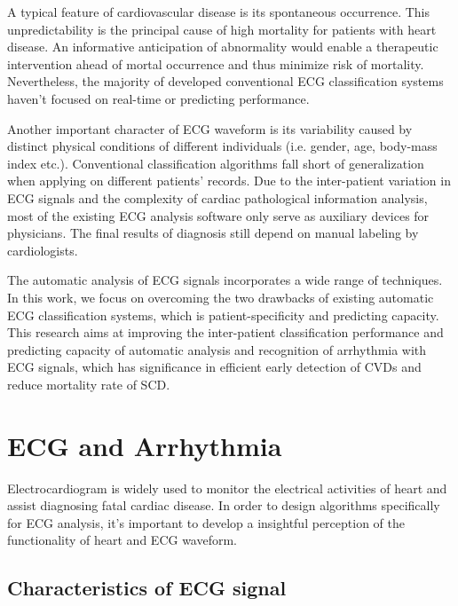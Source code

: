 A typical feature of cardiovascular disease is its spontaneous occurrence. This unpredictability is the principal cause of high mortality for patients with heart disease. An informative anticipation of abnormality would enable a therapeutic intervention ahead of mortal occurrence and thus minimize risk of mortality. Nevertheless, the majority of developed conventional ECG classification systems haven't focused on real-time or predicting performance. %

Another important character of ECG waveform is its variability caused by distinct physical conditions of different individuals (i.e. gender, age, body-mass index etc.)\cite{agesex}\cite{intervaria}. Conventional classification algorithms fall short of generalization when applying on different patients' records\cite{llamedo2012automatic}. Due to the inter-patient variation in ECG signals and the complexity of cardiac pathological information analysis, most of the existing ECG analysis software only serve as auxiliary devices for physicians. The final results of diagnosis still depend on manual labeling by cardiologists. %

The automatic analysis of ECG signals incorporates a wide range of techniques. In this work, we focus on overcoming the two drawbacks of existing automatic ECG classification systems, which is patient-specificity and predicting capacity. This research aims at improving the inter-patient classification performance and predicting capacity of automatic analysis and recognition of arrhythmia with ECG signals, which has significance in efficient early detection of CVDs and reduce mortality rate of SCD. 

\section{ECG and Arrhythmia}

Electrocardiogram is widely used to monitor the electrical activities of heart and assist diagnosing fatal cardiac disease. In order to design algorithms specifically for ECG analysis, it's important to develop a insightful perception of the functionality of heart and ECG waveform.  

\subsection{Characteristics of ECG signal}

